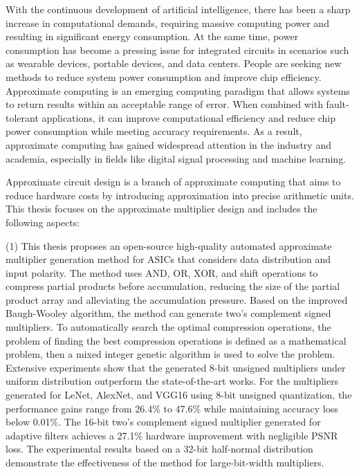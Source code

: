 \begin{abstract*}
      With the continuous development of artificial intelligence, there has been a sharp increase in computational demands, requiring massive computing power and resulting in significant energy consumption. At the same time, power consumption has become a pressing issue for integrated circuits in scenarios such as wearable devices, portable devices, and data centers. People are seeking new methods to reduce system power consumption and improve chip efficiency.
      Approximate computing is an emerging computing paradigm that allows systems to return results within an acceptable range of error. When combined with fault-tolerant applications, it can improve computational efficiency and reduce chip power consumption while meeting accuracy requirements. As a result, approximate computing has gained widespread attention in the industry and academia, especially in fields like digital signal processing and machine learning.
    
      Approximate circuit design is a branch of approximate computing that aims to reduce hardware costs by introducing approximation into precise arithmetic units. This thesis focuses on the approximate multiplier design and includes the following aspects:
    
      (1) This thesis proposes an open-source high-quality automated approximate multiplier generation method for ASICs that considers data distribution and input polarity. The method uses AND, OR, XOR, and shift operations to compress partial products before accumulation, reducing the size of the partial product array and alleviating the accumulation pressure. Based on the improved Baugh-Wooley algorithm, the method can generate two's complement signed multipliers. To 
      automatically search the optimal compression operations, the problem of finding the best compression operations is defined as a mathematical problem, then a mixed integer genetic algorithm is used to solve the problem. Extensive experiments show that the generated 8-bit unsigned multipliers under uniform distribution outperform the state-of-the-art works. For the multipliers generated for LeNet, AlexNet, and VGG16 using 8-bit unsigned quantization, the performance gains range from 26.4\% to 47.6\% while maintaining accuracy loss below 0.01\%. The 16-bit two's complement signed multiplier generated for adaptive filters achieves a 27.1\% hardware improvement with negligible PSNR loss. The experimental results based on a 32-bit half-normal distribution demonstrate the effectiveness of the method for large-bit-width multipliers.
    

\end{abstract*}
